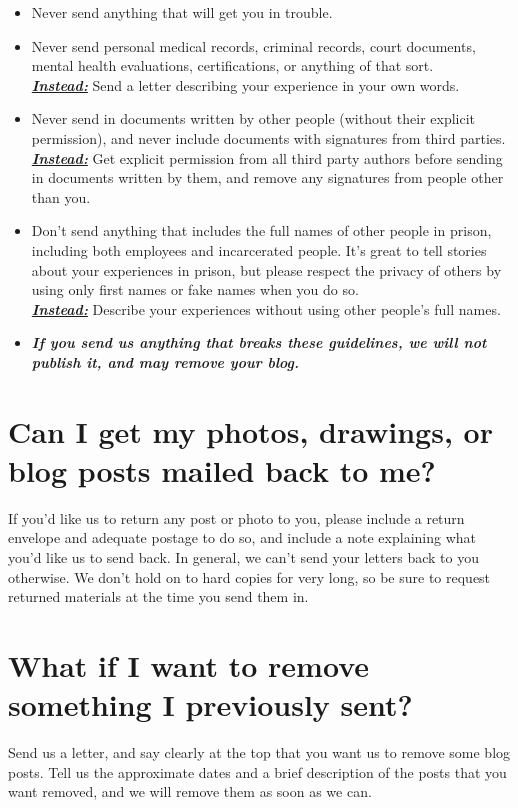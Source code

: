 \documentclass[12pt]{article}
\begin{document}
{{\begin{itemize}

    \item{ Never send anything that will get you in trouble. }
    \item{ Never send personal medical records, criminal records, court documents, mental health evaluations, certifications, or anything of that sort.\\ 
        {\bf \emph{\underline{Instead:}}} Send a letter describing your experience in your own words.
    }
    \item{ Never send in documents written by other people (without their explicit permission), and never include documents with signatures from third parties.\\
        {\bf \emph{\underline{Instead:}}} Get explicit permission from all third party authors before sending in documents written by them, and remove any signatures from people other than you.
    }
    \item{ Don't send anything that includes the full names of other people in prison, including both employees and incarcerated people.  It's great to tell stories about your experiences in prison, but please respect the privacy of others by using only first names or fake names when you do so.\\
        {\bf \emph{\underline{Instead:}}} Describe your experiences without using other people's full names.
    }
    \item[]{\bf \emph{If you send us anything that breaks these guidelines, we will not publish it, and may remove your blog.}}

\end{itemize}


\section*{Can I get my photos, drawings, or blog posts mailed back to me?}
If you'd like us to return any post or photo to you, please include a return envelope and adequate postage to do so, and include a note explaining what you'd like us to send back.  In general, we can't send your letters back to you otherwise.  We don't hold on to hard copies for very long, so be sure to request returned materials at the time you send them in.

\section*{What if I want to remove something I previously sent?}
Send us a letter, and say clearly at the top that you want us to remove some blog posts.  Tell us the approximate dates and a brief description of the posts that you want removed, and we will remove them as soon as we can.

}}
\end{document}
